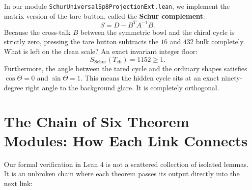 \documentclass[11pt,a4paper]{article}
\theoremstyle{definition}
\begin{document}
In our module \texttt{SchurUniversalSp8ProjectionExt.lean}, we implement the matrix version of the tare button, called the \textbf{Schur complement}:
\begin{equation}
S = D - B^T A^{-1} B.
\end{equation}
Because the cross-talk $B$ between the symmetric bowl and the chiral cycle is strictly zero, pressing the tare button subtracts the $16$ and $432$ bulk completely. What is left on the clean scale? An exact invariant integer floor:
\begin{equation}
S_{\mathrm{Schur}}(T_{\mathrm{ch}}) = 1152 \ge 1.
\end{equation}
Furthermore, the angle between the tared cycle and the ordinary shapes satisfies $\cos\Theta = 0$ and $\sin\Theta = 1$. This means the hidden cycle sits at an exact ninety-degree right angle to the background glare. It is completely orthogonal.

\section{The Chain of Six Theorem Modules: How Each Link Connects}

Our formal verification in Lean 4 is not a scattered collection of isolated lemmas. It is an unbroken chain where each theorem passes its output directly into the next link:
\end{document}
